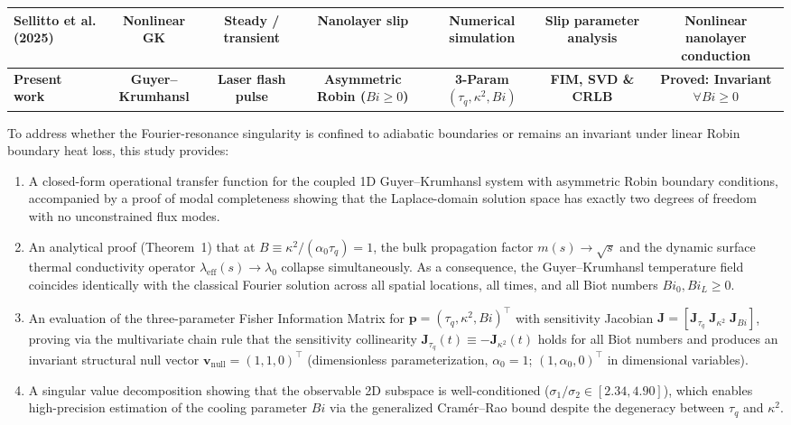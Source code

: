 \documentclass[preprint,12pt]{elsarticle}
\begin{document}
\begin{table}[t]
{\begin{tabular}{lcccccc}
Sellitto et al. (2025)~\cite{sellitto2025nonlinear} & Nonlinear GK & Steady / transient & Nanolayer slip & Numerical simulation & Slip parameter analysis & Nonlinear nanolayer conduction \\
\midrule
\textbf{Present work} & \textbf{Guyer--Krumhansl} & \textbf{Laser flash pulse} & \textbf{Asymmetric Robin ($Bi \ge 0$)} & \textbf{3-Param $(\tau_q, \kappa^2, Bi)$} & \textbf{FIM, SVD \& CRLB} & \textbf{Proved: Invariant $\forall Bi \ge 0$} \\
\bottomrule
\end{tabular}
}
\end{table}

To address whether the Fourier-resonance singularity is confined to adiabatic boundaries or remains an invariant under linear Robin boundary heat loss, this study provides:
\begin{enumerate}
    \item A closed-form operational transfer function for the coupled 1D Guyer--Krumhansl system with asymmetric Robin boundary conditions, accompanied by a proof of modal completeness showing that the Laplace-domain solution space has exactly two degrees of freedom with no unconstrained flux modes.
    \item An analytical proof (Theorem~1) that at $B \equiv \kappa^2 / (\alpha_0 \tau_q) = 1$, the bulk propagation factor $m(s) \to \sqrt{s}$ and the dynamic surface thermal conductivity operator $\lambda_{\mathrm{eff}}(s) \to \lambda_0$ collapse simultaneously. As a consequence, the Guyer--Krumhansl temperature field coincides identically with the classical Fourier solution across all spatial locations, all times, and all Biot numbers $Bi_0, Bi_L \ge 0$.
    \item An evaluation of the three-parameter Fisher Information Matrix for $\bm{p} = (\tau_q, \kappa^2, Bi)^\top$ with sensitivity Jacobian $\bm{J} = [\bm{J}_{\tau_q} \; \bm{J}_{\kappa^2} \; \bm{J}_{Bi}]$, proving via the multivariate chain rule that the sensitivity collinearity $\bm{J}_{\tau_q}(t) \equiv -\bm{J}_{\kappa^2}(t)$ holds for all Biot numbers and produces an invariant structural null vector $\bm{v}_{\mathrm{null}} = (1, 1, 0)^\top$ (dimensionless parameterization, $\alpha_0 = 1$; $(1, \alpha_0, 0)^\top$ in dimensional variables).
    \item A singular value decomposition showing that the observable 2D subspace is well-conditioned ($\sigma_1 / \sigma_2 \in [2.34, 4.90]$), which enables high-precision estimation of the cooling parameter $Bi$ via the generalized Cramér--Rao bound despite the degeneracy between $\tau_q$ and $\kappa^2$.

\end{enumerate}
\end{document}
